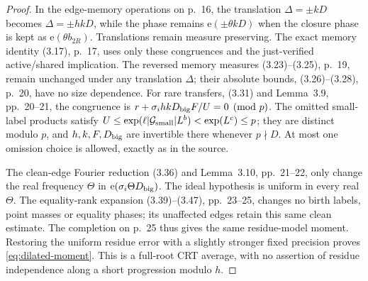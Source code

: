 \documentclass[11pt]{article}
\theoremstyle{definition}
\newcommand{\e}{\mathrm e}
\theoremstyle{remark}
\begin{document}
\begin{proof}
In the edge-memory operations on p.~16, the translation
$\Delta=\pm kD$ becomes $\Delta=\pm hkD$, while the phase remains
$\e(\pm\theta kD)$ when the closure phase is kept as
$\e(\theta b_{2R})$.
Translations remain measure preserving. The exact memory identity
(3.17), p.~17, uses only these congruences and the just-verified
active/shared implication. The reversed memory measures
(3.23)--(3.25), p.~19, remain unchanged under any translation $\Delta$;
their absolute bounds, (3.26)--(3.28), p.~20, have no size dependence.
For rare transfers, (3.31) and Lemma~3.9, pp.~20--21, the congruence
is $r+\sigma_i hkD_{\rm big}F/U=0\pmod p$.
The omitted small-label products satisfy
$U\le\exp(\ell|\mathcal G_{\rm small}|L^b)<\exp(L^c)\le p$;
they are distinct modulo $p$, and $h,k,F,D_{\rm big}$ are invertible
there whenever $p\nmid D$. At most one omission choice is allowed,
exactly as in the source.

The clean-edge Fourier reduction (3.36) and Lemma~3.10, pp.~21--22,
only change the real frequency $\Theta$ in $\e(\sigma_i\Theta
D_{\rm big})$. The ideal hypothesis is uniform in every real $\Theta$.
The equality-rank expansion (3.39)--(3.47), pp.~23--25, changes no
birth labels, point masses or equality phases; its unaffected edges
retain this same clean estimate. The completion on p.~25 thus gives
the same residue-model moment. Restoring the uniform residue error
with a slightly stronger fixed precision proves
\eqref{eq:dilated-moment}. This is a full-root CRT average, with no
assertion of residue independence along a short progression modulo $h$.


\end{proof}
\end{document}
